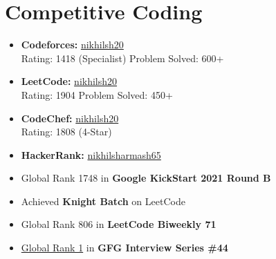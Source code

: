 \documentclass[a4paper,10pt]{article} %
\begin{document}
\section*{Competitive Coding}
\begin{itemize}[leftmargin=0.3in, itemsep=3pt, topsep=0pt]
    \item \textbf{Codeforces:} \href{https://codeforces.com/profile/nikhilsh20}{nikhilsh20} \\
    Rating: 1418 (Specialist) \hfill Problem Solved: 600+
    
    \item \textbf{LeetCode:} \href{https://leetcode.com/nikhilsh20}{nikhilsh20} \\
    Rating: 1904 \hfill Problem Solved: 450+

    \item \textbf{CodeChef:} \href{https://www.codechef.com/users/nikhilsh20}{nikhilsh20} \\
    Rating: 1808 (4-Star)
    \item \textbf{HackerRank:} \href{https://www.hackerrank.com/nikhilsharmash65}{nikhilsharmash65}
    \item Global Rank 1748 in \textbf{Google KickStart 2021 Round B}
    \item Achieved \textbf{Knight Batch} on LeetCode
    \item Global Rank 806 in \textbf{LeetCode Biweekly 71}
    \item \href{https://practice.geeksforgeeks.org/contest/interview-series-44/leaderboard}{Global Rank 1} in \textbf{GFG Interview Series \#44}

\end{itemize}
\end{document}
